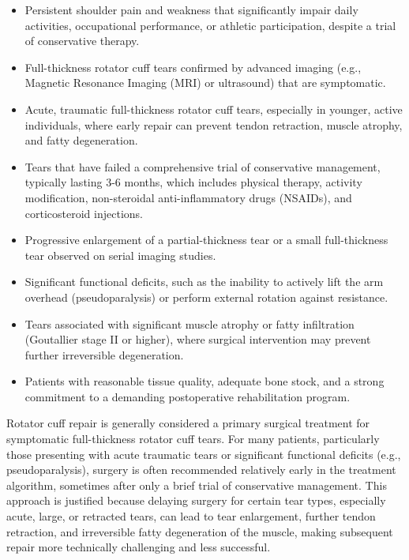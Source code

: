 \begin{itemize}
  \item Persistent shoulder pain and weakness that significantly impair daily activities, occupational performance, or athletic participation, despite a trial of conservative therapy.
  \item Full-thickness rotator cuff tears confirmed by advanced imaging (e.g., Magnetic Resonance Imaging (MRI) or ultrasound) that are symptomatic.
  \item Acute, traumatic full-thickness rotator cuff tears, especially in younger, active individuals, where early repair can prevent tendon retraction, muscle atrophy, and fatty degeneration.
  \item Tears that have failed a comprehensive trial of conservative management, typically lasting 3-6 months, which includes physical therapy, activity modification, non-steroidal anti-inflammatory drugs (NSAIDs), and corticosteroid injections.
  \item Progressive enlargement of a partial-thickness tear or a small full-thickness tear observed on serial imaging studies.
  \item Significant functional deficits, such as the inability to actively lift the arm overhead (pseudoparalysis) or perform external rotation against resistance.
  \item Tears associated with significant muscle atrophy or fatty infiltration (Goutallier stage II or higher), where surgical intervention may prevent further irreversible degeneration.
  \item Patients with reasonable tissue quality, adequate bone stock, and a strong commitment to a demanding postoperative rehabilitation program.
\end{itemize}

Rotator cuff repair is generally considered a primary surgical treatment for symptomatic full-thickness rotator cuff tears. For many patients, particularly those presenting with acute traumatic tears or significant functional deficits (e.g., pseudoparalysis), surgery is often recommended relatively early in the treatment algorithm, sometimes after only a brief trial of conservative management. This approach is justified because delaying surgery for certain tear types, especially acute, large, or retracted tears, can lead to tear enlargement, further tendon retraction, and irreversible fatty degeneration of the muscle, making subsequent repair more technically challenging and less successful.

